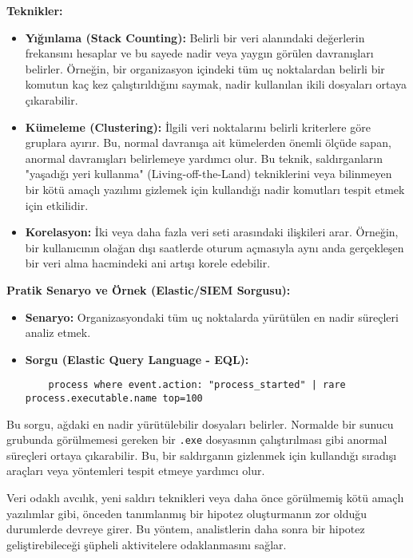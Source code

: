 \textbf{Teknikler:}

\begin{itemize}
    \item \textbf{Yığınlama (Stack Counting):} Belirli bir veri alanındaki değerlerin frekansını hesaplar ve bu sayede nadir veya yaygın görülen davranışları belirler. Örneğin, bir organizasyon içindeki tüm uç noktalardan belirli bir komutun kaç kez çalıştırıldığını saymak, nadir kullanılan ikili dosyaları ortaya çıkarabilir.
    \item \textbf{Kümeleme (Clustering):} İlgili veri noktalarını belirli kriterlere göre gruplara ayırır. Bu, normal davranışa ait kümelerden önemli ölçüde sapan, anormal davranışları belirlemeye yardımcı olur. Bu teknik, saldırganların "yaşadığı yeri kullanma" (Living-off-the-Land) tekniklerini veya bilinmeyen bir kötü amaçlı yazılımı gizlemek için kullandığı nadir komutları tespit etmek için etkilidir.
    \item \textbf{Korelasyon:} İki veya daha fazla veri seti arasındaki ilişkileri arar. Örneğin, bir kullanıcının olağan dışı saatlerde oturum açmasıyla aynı anda gerçekleşen bir veri alma hacmindeki ani artışı korele edebilir.
\end{itemize}

\textbf{Pratik Senaryo ve Örnek (Elastic/SIEM Sorgusu):}

\begin{itemize}
    \item \textbf{Senaryo:} Organizasyondaki tüm uç noktalarda yürütülen en nadir süreçleri analiz etmek.
    \item \textbf{Sorgu (Elastic Query Language - EQL):}
    \begin{verbatim}
    process where event.action: "process_started" | rare process.executable.name top=100
    \end{verbatim}
\end{itemize}

Bu sorgu, ağdaki en nadir yürütülebilir dosyaları belirler. Normalde bir sunucu grubunda görülmemesi gereken bir \texttt{.exe} dosyasının çalıştırılması gibi anormal süreçleri ortaya çıkarabilir. Bu, bir saldırganın gizlenmek için kullandığı sıradışı araçları veya yöntemleri tespit etmeye yardımcı olur.

Veri odaklı avcılık, yeni saldırı teknikleri veya daha önce görülmemiş kötü amaçlı yazılımlar gibi, önceden tanımlanmış bir hipotez oluşturmanın zor olduğu durumlerde devreye girer. Bu yöntem, analistlerin daha sonra bir hipotez geliştirebileceği şüpheli aktivitelere odaklanmasını sağlar.

